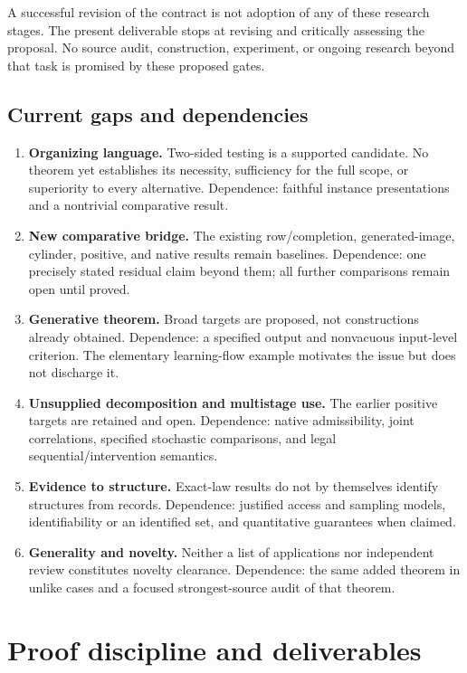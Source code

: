\documentclass[11pt]{article}
\theoremstyle{remark}
\begin{document}
A successful revision of the contract is not adoption of any of these research stages. The present deliverable stops at revising and critically assessing the proposal. No source audit, construction, experiment, or ongoing research beyond that task is promised by these proposed gates.

\subsection{Current gaps and dependencies}

\begin{enumerate}
\item \textbf{Organizing language.} Two-sided testing is a supported candidate. No theorem yet establishes its necessity, sufficiency for the full scope, or superiority to every alternative. Dependence: faithful instance presentations and a nontrivial comparative result.
\item \textbf{New comparative bridge.} The existing row/completion, generated-image, cylinder, positive, and native results remain baselines. Dependence: one precisely stated residual claim beyond them; all further comparisons remain open until proved.
\item \textbf{Generative theorem.} Broad targets are proposed, not constructions already obtained. Dependence: a specified output and nonvacuous input-level criterion. The elementary learning-flow example motivates the issue but does not discharge it.
\item \textbf{Unsupplied decomposition and multistage use.} The earlier positive targets are retained and open. Dependence: native admissibility, joint correlations, specified stochastic comparisons, and legal sequential/intervention semantics.
\item \textbf{Evidence to structure.} Exact-law results do not by themselves identify structures from records. Dependence: justified access and sampling models, identifiability or an identified set, and quantitative guarantees when claimed.
\item \textbf{Generality and novelty.} Neither a list of applications nor independent review constitutes novelty clearance. Dependence: the same added theorem in unlike cases and a focused strongest-source audit of that theorem.
\end{enumerate}

\section{Proof discipline and deliverables}
\label{sec:discipline}
\end{document}
